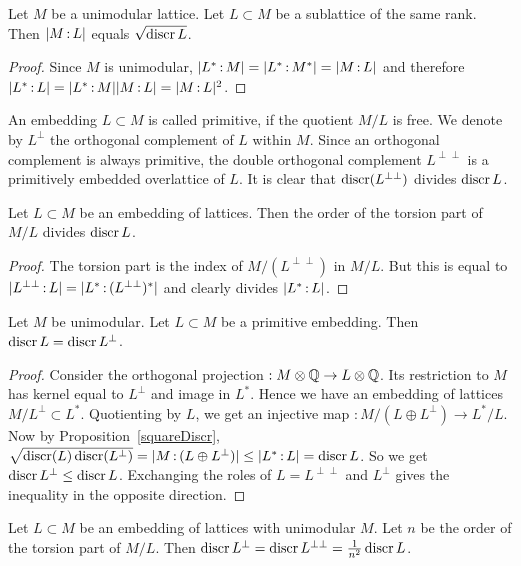 \begin{proposition} \label{squareDiscr}Let $M$ be a unimodular lattice. Let $L\subset M$ be a sublattice of the same rank. Then $|M\,{:}\, L|$ equals $\sqrt{\operatorname{discr} L}$.
\end{proposition}
\begin{proof}
Since $M$ is unimodular, $|L^*\,{:}\, M|=|L^*\,{:}\, M^*| =|M\,{:}\, L| $ and therefore $|L^*\,{:}\, L| = |L^*\,{:}\, M||M\,{:}\, L|  = |M\,{:}\, L|^2$.
\end{proof}
An embedding $L\subset M$ is called primitive, if the quotient $M/L$ is free. We denote by $L^\perp$ the orthogonal complement of $L$ within $M$. Since an orthogonal complement is always primitive, the double orthogonal complement $ L^{\perp\perp}$ is a primitively embedded overlattice of $L$. It is clear that $\operatorname{discr}( L^{\perp\perp})$ divides $\operatorname{discr} L$. 
\begin{proposition}\label{TorsionQuotient} Let $L\subset M$ be an embedding of lattices. Then the order of the torsion part of $M/L$ 
divides $\operatorname{discr} L$.
\end{proposition}
\begin{proof}
The torsion part is the index of $M/( L^{\perp\perp})$ in $M/L$. But this is equal to $|L^{\perp\perp}\,{:}\, L| = |L^* \,{:}\, (L^{\perp\perp})^*|$ and clearly divides $|L^*\,{:}\, L|$.
\end{proof}
\begin{proposition}\label{discrOrthPrim}
Let $M$ be unimodular. Let $L\subset M$ be a primitive embedding. Then $\operatorname{discr} L = \operatorname{discr} L^\perp$.
\end{proposition}
\begin{proof}
Consider the orthogonal projection $ : M\otimes\mathbb{Q} \rightarrow L\otimes \mathbb{Q}$. Its restriction to $M$ has kernel equal to $L^\perp$ and image in $L^*$. Hence we have an embedding of lattices $M/L^\perp \subset L^*$. Quotienting by $L$, we get an injective map $: M/(L\oplus L^\perp) \rightarrow L^*/L$. 
Now by Proposition~\ref{squareDiscr}, $\sqrt{\operatorname{discr}(L) \operatorname{discr} (L^\perp)} =|M \,{:}\, (L\oplus L^\perp)| \leq |L^*\,{:}\, L| = \operatorname{discr} L$. So we get $\operatorname{discr} L^\perp \leq \operatorname{discr} L$. Exchanging the roles of $L=L^{\perp\perp}$ and $L^\perp$ gives the inequality in the opposite direction.
\end{proof}
\begin{corollary}\label{latticeCor}
Let $L\subset M$ be an embedding of lattices with unimodular $M$. Let $n$ be the order of the torsion part of $M/L$. Then $\operatorname{discr} L^\perp =\operatorname{discr} L^{\perp\perp} = \frac{1}{n^2}\operatorname{discr} L$.
\end{corollary}




